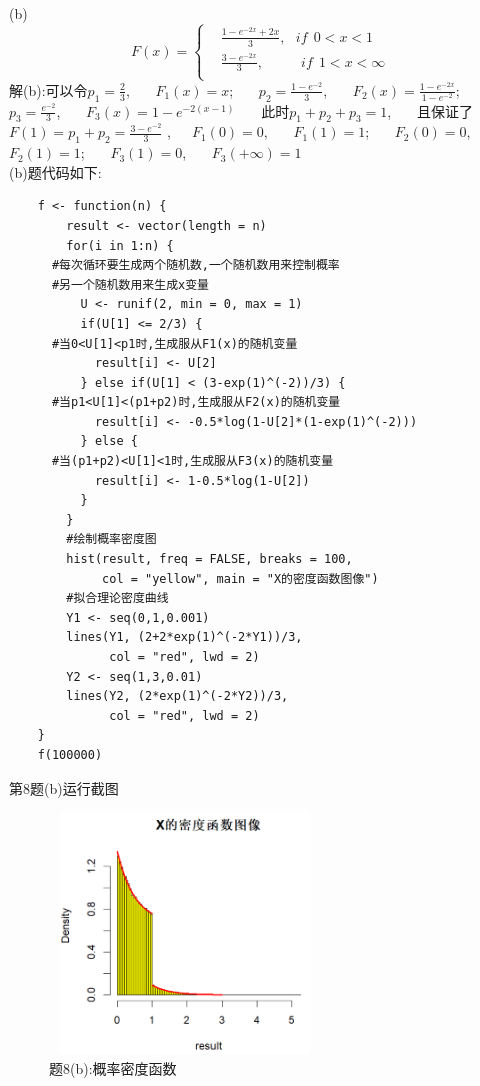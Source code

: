 \documentclass{book}
\begin{document}
(b) \begin{equation}
  F(x) =\left\{
  \begin{aligned}
     & \frac{1-e^{-2x}+2x}{3} , \ \ \ if \ \ 0 < x < 1                     \\
     & \frac{3-e^{-2x}}{3} , \ \ \ \ \ \ \ \ \ \ \ \ if \ \ 1 < x < \infty \\
  \end{aligned}
  \right.
\end{equation}
解(b):可以令$p_{1}=\frac{2}{3}$, \ \ \ $F_{1}(x) = x$; \ \ \ $p_{2} = \frac{1-e^{-2}}{3}$, \ \ \
$F_{2}(x) = \frac{1-e^{-2x}}{1-e^{-2}}$; \ \ \ $p_{3}=\frac{e^{-2}}{3}$, \ \ \ $F_{3}(x) = 1-e^{-2(x-1)}$ \ \ \
此时$p_{1}+p_{2}+p_{3}=1$, \ \ \ 且保证了$F(1) = p_{1} + p_{2} = \frac{3-e^{-2}}{3}$ ,\ \ \ $F_{1}(0) = 0$, \ \ \ $F_{1}(1) = 1$; \ \ \
$F_{2}(0) = 0$, \ \ \ $F_{2}(1) = 1$; \ \ \ $F_{3}(1) = 0$, \ \ \ $F_{3}(+\infty) = 1$ \\
(b)题代码如下:
\lstset{language = R}
\begin{lstlisting}
    f <- function(n) {
        result <- vector(length = n)
        for(i in 1:n) {
      #每次循环要生成两个随机数,一个随机数用来控制概率
      #另一个随机数用来生成x变量
          U <- runif(2, min = 0, max = 1)
          if(U[1] <= 2/3) {
      #当0<U[1]<p1时,生成服从F1(x)的随机变量
            result[i] <- U[2]
          } else if(U[1] < (3-exp(1)^(-2))/3) {
      #当p1<U[1]<(p1+p2)时,生成服从F2(x)的随机变量
            result[i] <- -0.5*log(1-U[2]*(1-exp(1)^(-2)))
          } else {
      #当(p1+p2)<U[1]<1时,生成服从F3(x)的随机变量
            result[i] <- 1-0.5*log(1-U[2])
          }
        }
        #绘制概率密度图
        hist(result, freq = FALSE, breaks = 100, 
             col = "yellow", main = "X的密度函数图像")
        #拟合理论密度曲线
        Y1 <- seq(0,1,0.001)
        lines(Y1, (2+2*exp(1)^(-2*Y1))/3, 
              col = "red", lwd = 2)
        Y2 <- seq(1,3,0.01)
        lines(Y2, (2*exp(1)^(-2*Y2))/3, 
              col = "red", lwd = 2)
    }
    f(100000)
\end{lstlisting}
第8题(b)运行截图
\begin{figure}[H]
  \centering
  \includegraphics*[height = 6.4cm, width = 7.2cm]{gramFile/第八题/(b)题概率密度函数图像.PNG}
  \caption{题8(b):概率密度函数}
\end{figure}
\end{document}

